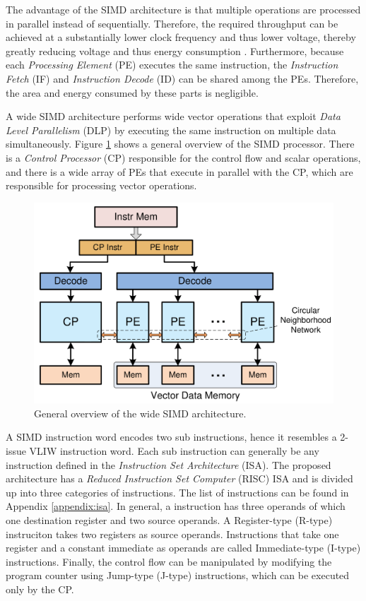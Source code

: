 
The advantage of the SIMD architecture is that multiple operations are processed in parallel instead of sequentially. Therefore, the required throughput can be achieved at a substantially lower clock frequency and thus lower voltage, thereby greatly reducing voltage and thus energy consumption \cite{dongrio1}. Furthermore, because each \emph{Processing Element} (PE) executes the same instruction, the \emph{Instruction Fetch} (IF) and \emph{Instruction Decode} (ID) can be shared among the PEs. Therefore, the area and energy consumed by these parts is negligible.  %

A wide SIMD architecture \cite{simd} performs wide vector operations that exploit \emph{Data Level Parallelism} (DLP) by executing the same instruction on multiple data simultaneously. Figure \ref{fig:simd_overview} shows a general overview of the SIMD processor.
There is a \emph{Control Processor} (CP) responsible for the control flow and scalar operations, and there is a wide array of PEs that execute in parallel with the CP, which are responsible for processing vector operations.

\begin{figure}[H]
\centering
\includegraphics[width=.6\textwidth]{figures/simd_overview}
\caption{General overview of the wide SIMD architecture.}
\label{fig:simd_overview}
\end{figure}
A SIMD instruction word encodes two sub instructions, hence it resembles a 2-issue VLIW instruction word. Each sub instruction can generally be any instruction defined in the \emph{Instruction Set Architecture} (ISA). The proposed architecture has a \emph{Reduced Instruction Set Computer} (RISC) ISA and is divided up into three categories of instructions. The list of instructions can be found in Appendix \ref{appendix:isa}. In general, a instruction has three operands of which one destination register and two source operands. A Register-type (R-type) instruciton takes two registers as source operands. Instructions that take one register and a constant immediate as operands are called Immediate-type (I-type) instructions. Finally, the control flow can be manipulated by modifying the program counter using Jump-type (J-type) instructions, which can be executed only by the CP.
\\

